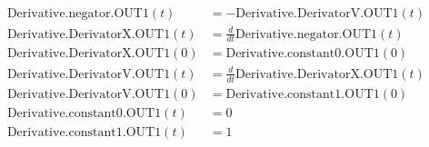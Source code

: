 \documentclass{article}
\begin{document}
\[
\begin{aligned}
\mathrm{Derivative.negator.OUT1}(t) &= -\mathrm{Derivative.DerivatorV.OUT1}(t) \\[4pt]
\mathrm{Derivative.DerivatorX.OUT1}(t) &= \frac{d}{dt} \mathrm{Derivative.negator.OUT1}(t) \\[4pt]
\mathrm{Derivative.DerivatorX.OUT1}(0) &= \mathrm{Derivative.constant0.OUT1}(0) \\[4pt]
\mathrm{Derivative.DerivatorV.OUT1}(t) &= \frac{d}{dt} \mathrm{Derivative.DerivatorX.OUT1}(t) \\[4pt]
\mathrm{Derivative.DerivatorV.OUT1}(0) &= \mathrm{Derivative.constant1.OUT1}(0) \\[4pt]
\mathrm{Derivative.constant0.OUT1}(t) &= 0 \\[4pt]
\mathrm{Derivative.constant1.OUT1}(t) &= 1
\end{aligned}
\]
\end{document}
